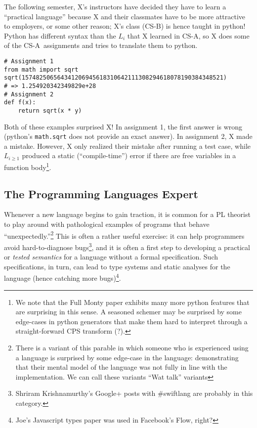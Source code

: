 \documentclass[12pt]{article}
\newcommand{\csa}{\textsc{CS-A}}
\newcommand{\csb}{\textsc{CS-B}}
\begin{document}
The following semester, X's instructors have decided they have to learn a
``practical language'' because X and their classmates have to be more attractive
to employers, or some other reason; X's class (\csb) is hence taught in
python! Python has different syntax than the $L_i$ that X learned in \csa, so X
does some of the \csa~assignments and tries to translate them to python.

\begin{verbatim}
# Assignment 1
from math import sqrt
sqrt(157482506564341206945618310642111308294618078190384348521)
# => 1.254920342349829e+28
# Assignment 2
def f(x):
    return sqrt(x * y)
\end{verbatim}

Both of these examples surprised X! In assignment 1, the first answer is wrong
(python's \verb|math.sqrt| does not provide an exact answer). In assignment 2, X
made a mistake. However, X only realized their mistake after running a test
case, while $L_{i \geq 1}$ produced a static (``compile-time'') error if there
are free variables in a function body\footnote{We note that the Full Monty paper
exhibits many more python features that are surprising in this sense. A
seasoned schemer may be surprised by some edge-cases in python generators that
make them hard to interpret through a straight-forward CPS transform (?).}.


\subsection{The Programming Languages Expert}

Whenever a new language begins to gain traction, it is common for a PL theorist
to play around with pathological examples of programs that behave
``unexpectedly.''\footnote{There is a variant of this parable in which someone
  who is experienced using a language is surprised by some edge-case in the
  language: demonstrating that their mental model of the language was not fully
  in line with the implementation. We can call these variants ``Wat talk''
  variants} 
This is often a rather useful exercise: it can help programmers avoid
hard-to-diagnose bugs\footnote{Shriram Krishnamurthy's Google+ posts
with \#swiftlang are probably in this category.}, and it is often a first step to
developing a practical or \emph{tested semantics} for a language without a
formal specification. Such specifications, in turn, can lead to type systems and
static analyses for the language (hence catching more bugs)\footnote{Joe's
Javascript types paper was used in Facebook's Flow, right?}.
\end{document}
